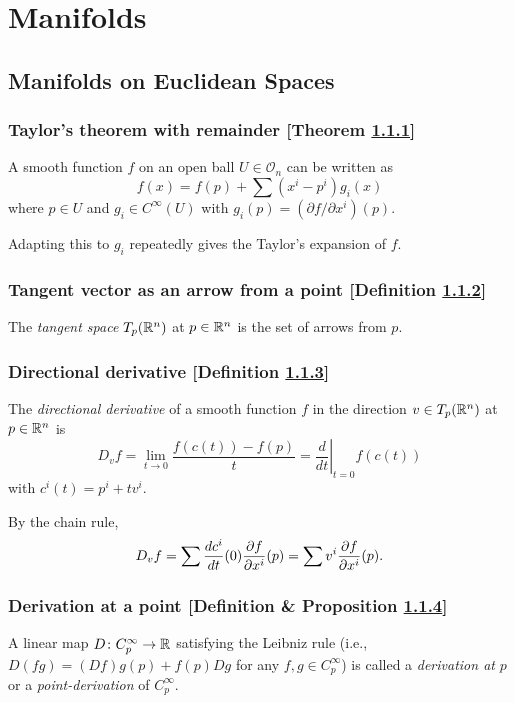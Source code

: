 \section{Manifolds}
\subsection{Manifolds on Euclidean Spaces}
\subsubsection{Taylor's theorem with remainder [Theorem \ref{taylors-theorem-with-remainder}]}\label{taylors-theorem-with-remainder}
A smooth function $f$ on an open ball $U \in \mathcal{O}_n$ can be written as
\[
f(x) = f(p) + \sum (x^i - p^i) g_i(x)
\]
where $p \in U$ and $g_i \in C^\infty (U)$ with $g_i(p) = (\partial f / \partial x^i)(p)$.

Adapting this to $g_i$ repeatedly gives the Taylor's expansion of $f$.

\subsubsection{Tangent vector as an arrow from a point [Definition \ref{tangent-vector-as-an-arrow-from-a-point}]}\label{tangent-vector-as-an-arrow-from-a-point}
The \textit{tangent space} $T_p (\mathbb{R}^n)$ at $p \in \mathbb{R}^n$ is the set of arrows from $p$.

\subsubsection{Directional derivative [Definition \ref{directional-derivative}]}\label{directional-derivative}
The \textit{directional derivative} of a smooth function $f$ in the direction $v \in T_p(\mathbb{R}^n)$ at $p \in \mathbb{R}^n$ is
\[
D_v f = \lim_{t \to 0} \frac{f(c(t)) - f(p)}{t} = \left. \frac{d}{dt}\right|_{t=0} f(c(t))
\]
with $c^i(t) = p^i + tv^i$.

By the chain rule,
\[
D_v f = \sum \frac{dc^i}{dt}(0)\frac{\partial f}{\partial x^i}(p) = \sum v^i \frac{\partial f}{\partial x^i}(p).
\]

\subsubsection{Derivation at a point [Definition \& Proposition \ref{derivation-at-a-point}]}\label{derivation-at-a-point}
A linear map $D \colon C_p^\infty \to \mathbb{R}$ satisfying the Leibniz rule (i.e., $D(fg) = (D f)g(p) + f(p)D g$ for any $f, g \in C_p^\infty$) is called a \textit{derivation at} $p$ or a \textit{point-derivation} of $C_p^\infty$.

